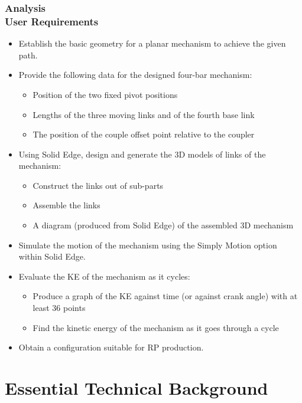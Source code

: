 \documentclass[ucs,10pt]{beamer}
\begin{document}
\begin{frame}
\frametitle{Analysis \\
    \small \color{rwth-blue} User Requirements}
    \begin{itemize}
        \item Establish the basic geometry for a planar mechanism to achieve the given path.
        \item Provide the following data for the designed four-bar mechanism:
        \begin{itemize}
            \item Position of the two fixed pivot positions
            \item Lengths of the three moving links and of the fourth base link
            \item The position of the couple offset point relative to the coupler
        \end{itemize}
        \item Using Solid Edge, design and generate the 3D models of links of the mechanism:
        \begin{itemize}
            \item Construct the links out of sub-parts
            \item Assemble the links
            \item A diagram (produced from Solid Edge) of the assembled 3D mechanism
        \end{itemize}
        \item Simulate the motion of the mechanism using the Simply Motion option within Solid Edge.
        \item Evaluate the KE of the mechanism as it cycles:
        \begin{itemize}
            \item Produce a graph of the KE against time (or against crank angle) with at least 36 points
            \item Find the kinetic energy of the mechanism as it goes through a cycle
        \end{itemize}
        \item Obtain a configuration suitable for RP production.
    \end{itemize}
\end{frame}



\section{Essential Technical Background}
\end{document}
